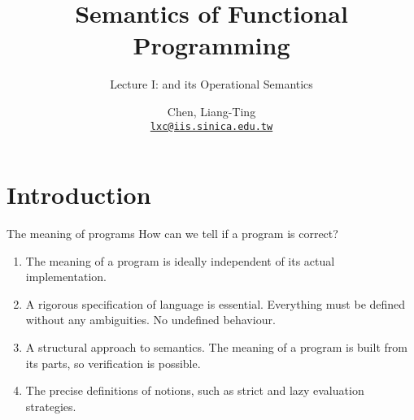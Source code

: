 \title{Semantics of Functional Programming}
\subtitle{Lecture I: \PCF{} and its Operational Semantics}
\author[L.-T. Chen]{Chen, Liang-Ting\\
  \href{mailto:lxc@iis.sinica.edu.tw}{\texttt{lxc@iis.sinica.edu.tw}}}


\setcounter{framenumber}{-1}

\frame{\maketitle}
\section{Introduction}

\begin{frame}{The meaning of programs}
  How can we tell if a program is correct? 
  \begin{enumerate}
    \item The meaning of a program is ideally independent of its actual implementation.
    \item A rigorous specification of language is essential. Everything must be
      defined without any ambiguities. No undefined behaviour. 
    \item A structural approach to semantics. The meaning of a program is
      built from its parts, so verification is possible. 
    \item The precise definitions of notions, such as strict and lazy
      evaluation strategies. 
  \end{enumerate}
\end{frame}

